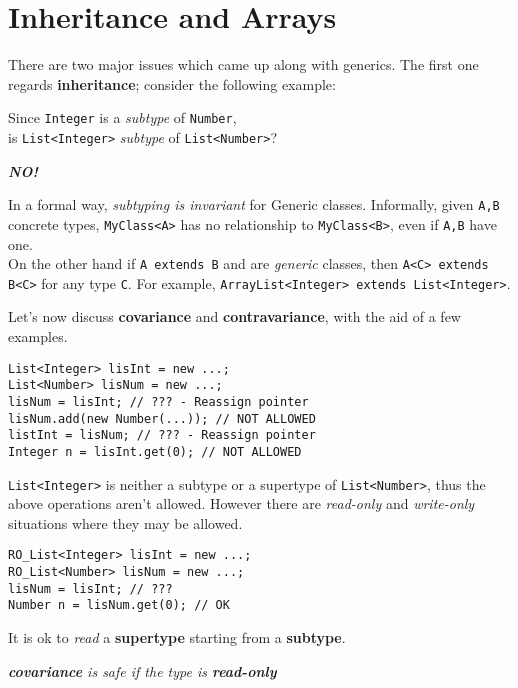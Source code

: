 \section{Inheritance and Arrays}
There are two major issues which came up along with generics.
The first one regards \textbf{inheritance}; 
consider the following example:
\begin{center}
   Since \lstinline|Integer| is a \textit{subtype} of \lstinline|Number|,\\
   is \lstinline|List<Integer>| \textit{subtype} of \lstinline|List<Number>|?\nl

   {\color{red}\textbf{\textit{NO!}}}
\end{center}
In a formal way, \textit{subtyping is invariant} for Generic classes.
Informally, given \lstinline|A,B| concrete types, \lstinline|MyClass<A>| has no relationship to \lstinline|MyClass<B>|,
even if \lstinline|A,B| have one.\\
On the other hand if \lstinline|A extends B| and are \textit{generic} classes, 
then \lstinline|A<C> extends B<C>| for any type \lstinline|C|.
For example, \lstinline|ArrayList<Integer> extends List<Integer>|.
\nl

Let's now discuss \textbf{covariance} and \textbf{contravariance}, with the aid of a few examples.

\begin{lstlisting}
List<Integer> lisInt = new ...;
List<Number> lisNum = new ...;
lisNum = lisInt; // ??? - Reassign pointer
lisNum.add(new Number(...)); // NOT ALLOWED
listInt = lisNum; // ??? - Reassign pointer
Integer n = lisInt.get(0); // NOT ALLOWED
\end{lstlisting}

\lstinline|List<Integer>| is neither a subtype or a supertype of \lstinline|List<Number>|,
thus the above operations aren't allowed.
However there are \textit{read-only} and \textit{write-only} situations where they may be allowed.

\begin{lstlisting}
RO_List<Integer> lisInt = new ...;
RO_List<Number> lisNum = new ...;
lisNum = lisInt; // ???
Number n = lisNum.get(0); // OK
\end{lstlisting}
It is ok to \textit{read} a \textbf{supertype} starting from a \textbf{subtype}.
\begin{center}
   \textit{\textbf{covariance} is safe if the type is \textbf{read-only}}
\end{center}

